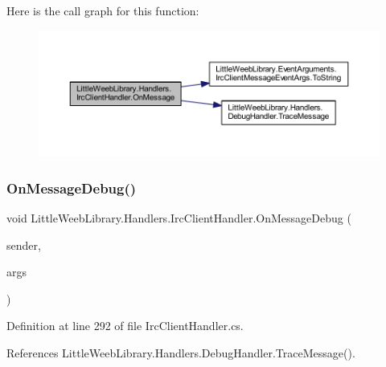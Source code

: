 Here is the call graph for this function\+:\nopagebreak
\begin{figure}[H]
\begin{center}
\leavevmode
\includegraphics[width=350pt]{class_little_weeb_library_1_1_handlers_1_1_irc_client_handler_ad97947bcce5bebd851bef6e29fecb467_cgraph}
\end{center}
\end{figure}
\mbox{\label{class_little_weeb_library_1_1_handlers_1_1_irc_client_handler_a2b48c617972be0b3079a262ffc8141f6}} 
\subsubsection{\texorpdfstring{On\+Message\+Debug()}{OnMessageDebug()}}
{\footnotesize\ttfamily void Little\+Weeb\+Library.\+Handlers.\+Irc\+Client\+Handler.\+On\+Message\+Debug (\begin{DoxyParamCaption}\item[{object}]{sender,  }\item[{Irc\+Debug\+Message\+Event\+Args}]{args }\end{DoxyParamCaption})\hspace{0.3cm}{\ttfamily [private]}}



Definition at line 292 of file Irc\+Client\+Handler.\+cs.



References Little\+Weeb\+Library.\+Handlers.\+Debug\+Handler.\+Trace\+Message().


